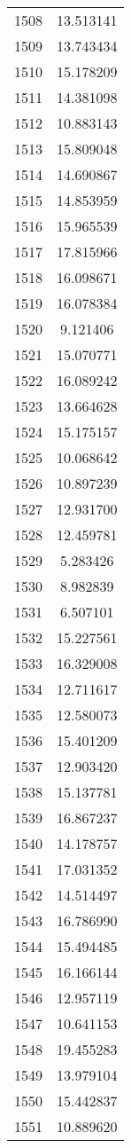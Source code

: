 \documentclass[12pt]{article}
\begin{document}
\begin{longtable}{@{}cc@{}}
1508 & 13.513141 \\
1509 & 13.743434 \\
1510 & 15.178209 \\
1511 & 14.381098 \\
1512 & 10.883143 \\
1513 & 15.809048 \\
1514 & 14.690867 \\
1515 & 14.853959 \\
1516 & 15.965539 \\
1517 & 17.815966 \\
1518 & 16.098671 \\
1519 & 16.078384 \\
1520 & 9.121406 \\
1521 & 15.070771 \\
1522 & 16.089242 \\
1523 & 13.664628 \\
1524 & 15.175157 \\
1525 & 10.068642 \\
1526 & 10.897239 \\
1527 & 12.931700 \\
1528 & 12.459781 \\
1529 & 5.283426 \\
1530 & 8.982839 \\
1531 & 6.507101 \\
1532 & 15.227561 \\
1533 & 16.329008 \\
1534 & 12.711617 \\
1535 & 12.580073 \\
1536 & 15.401209 \\
1537 & 12.903420 \\
1538 & 15.137781 \\
1539 & 16.867237 \\
1540 & 14.178757 \\
1541 & 17.031352 \\
1542 & 14.514497 \\
1543 & 16.786990 \\
1544 & 15.494485 \\
1545 & 16.166144 \\
1546 & 12.957119 \\
1547 & 10.641153 \\
1548 & 19.455283 \\
1549 & 13.979104 \\
1550 & 15.442837 \\
1551 & 10.889620 \\

\end{longtable}
\end{document}
